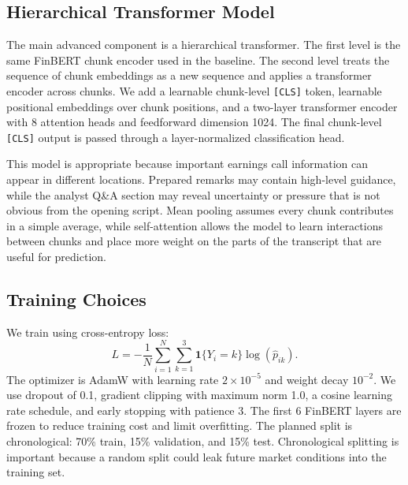 \documentclass[11pt]{article}
\begin{document}
\subsection{Hierarchical Transformer Model}

The main advanced component is a hierarchical transformer. The first level is the same FinBERT chunk encoder used in the baseline. The second level treats the sequence of chunk embeddings as a new sequence and applies a transformer encoder across chunks. We add a learnable chunk-level \texttt{[CLS]} token, learnable positional embeddings over chunk positions, and a two-layer transformer encoder with 8 attention heads and feedforward dimension 1024. The final chunk-level \texttt{[CLS]} output is passed through a layer-normalized classification head.

This model is appropriate because important earnings call information can appear in different locations. Prepared remarks may contain high-level guidance, while the analyst Q\&A section may reveal uncertainty or pressure that is not obvious from the opening script. Mean pooling assumes every chunk contributes in a simple average, while self-attention allows the model to learn interactions between chunks and place more weight on the parts of the transcript that are useful for prediction.

\subsection{Training Choices}

We train using cross-entropy loss:
\[
L = -\frac{1}{N}\sum_{i=1}^{N}\sum_{k=1}^{3}\mathbf{1}\{Y_i=k\}\log(\hat{p}_{ik}).
\]
The optimizer is AdamW with learning rate $2\times 10^{-5}$ and weight decay $10^{-2}$. We use dropout of 0.1, gradient clipping with maximum norm 1.0, a cosine learning rate schedule, and early stopping with patience 3. The first 6 FinBERT layers are frozen to reduce training cost and limit overfitting. The planned split is chronological: 70\% train, 15\% validation, and 15\% test. Chronological splitting is important because a random split could leak future market conditions into the training set.
\end{document}
